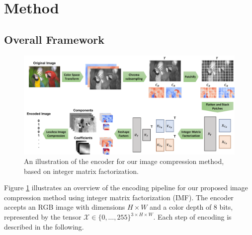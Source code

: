 \section{Method} \label{sec: method}



\subsection{Overall Framework} \label{sec: overall framework}

\begin{figure}[t]
	\centering
	\includegraphics[width=\linewidth]{figures/imf_encoder.pdf}
	\vspace{10pt}
	\caption{An illustration of the encoder for our image compression method, based on integer matrix factorization.}
	\label{fig:imf_encoder}
\end{figure}

Figure \ref{fig:imf_encoder} illustrates an overview of the encoding pipeline for our proposed image compression method using integer matrix factorization (IMF). The encoder accepts an RGB image with dimensions $H \times W$ and a color depth of 8 bits, represented by the tensor $\bm{\mathcal{X}} \in \{0, \ldots, 255\}^{3 \times H \times W}$. Each step of encoding is described in the following.

